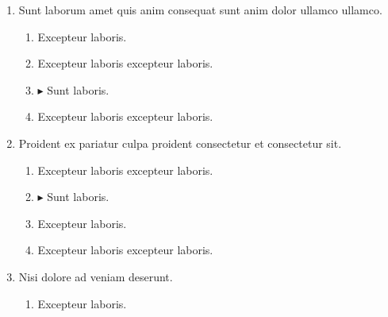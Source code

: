 \documentclass[a4paper,12pt]{article}
\begin{document}
\begin{enumerate}[label=\textbf{\arabic*.}]
\begin{multicols}{2}
\begin{enumerate}
		\item  Excepteur laboris.
    
		\item  Excepteur laboris excepteur laboris.
    
		\item $\blacktriangleright$  Sunt laboris.
    
	\end{enumerate}

\end{multicols}
\item Sunt laborum amet quis anim consequat sunt anim dolor ullamco ullamco.
\begin{multicols}{2}
	\begin{enumerate}
		\item  Excepteur laboris.
    
		\item  Excepteur laboris excepteur laboris.
    
		\item $\blacktriangleright$  Sunt laboris.
    
		\item  Excepteur laboris excepteur laboris.
  
	\end{enumerate}

\end{multicols}
\item Proident ex pariatur culpa proident consectetur et consectetur sit.
\begin{multicols}{2}
	\begin{enumerate}
		\item  Excepteur laboris excepteur laboris.
  
		\item $\blacktriangleright$  Sunt laboris.
    
		\item  Excepteur laboris.
    
		\item  Excepteur laboris excepteur laboris.
    
	\end{enumerate}

\end{multicols}
\item Nisi dolore ad veniam deserunt.
\begin{multicols}{2}
	\begin{enumerate}
		\item  Excepteur laboris.
    

\end{enumerate}
\end{multicols}
\end{enumerate}
\end{document}
